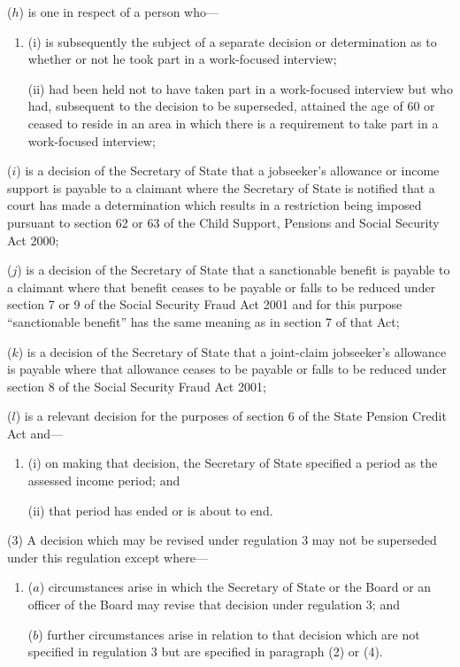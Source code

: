 \documentclass[12pt,a4paper]{article}
\begin{document}
\begin{enumerate}
($h$) is one in respect of a person who—
\begin{enumerate}\item[]
(i) is subsequently the subject of a separate decision or determination as to whether or not he took part in a work-focused interview;

(ii) had been held not to have taken part in a work-focused interview but who had, subsequent to the decision to be superseded, attained the age of 60 or ceased to reside in an area in which there is a requirement to take part in a work-focused interview;
\end{enumerate}

($i$) is a decision of the Secretary of State that a jobseeker’s allowance or income support is payable to a claimant where the Secretary of State is notified that a court has made a determination which results in a restriction being imposed pursuant to section 62 or 63 of the Child Support, Pensions and Social Security Act 2000;

($j$) is a decision of the Secretary of State that a sanctionable benefit is payable to a claimant where that benefit ceases to be payable or falls to be reduced under section 7 or 9 of the Social Security Fraud Act 2001 and for this purpose “sanctionable benefit” has the same meaning as in section 7 of that Act;

($k$) is a decision of the Secretary of State that a joint-claim jobseeker’s allowance is payable where that allowance ceases to be payable or falls to be reduced under section 8 of the Social Security Fraud Act 2001;

($l$) is a relevant decision for the purposes of section 6 of the State Pension Credit Act and—
\begin{enumerate}\item[]
(i) on making that decision, the Secretary of State specified a period as the assessed income period; and

(ii) that period has ended or is about to end.
\end{enumerate}
\end{enumerate}

(3) A decision which may be revised under regulation 3 may not be superseded under this regulation except where—
\begin{enumerate}\item[]
($a$) circumstances arise in which the Secretary of State 
or the Board or an officer of the Board  %
may revise that decision under regulation 3; and

($b$) further circumstances arise in relation to that decision which are not specified in regulation 3 but are specified in paragraph (2) or (4).
\end{enumerate}
\end{document}
